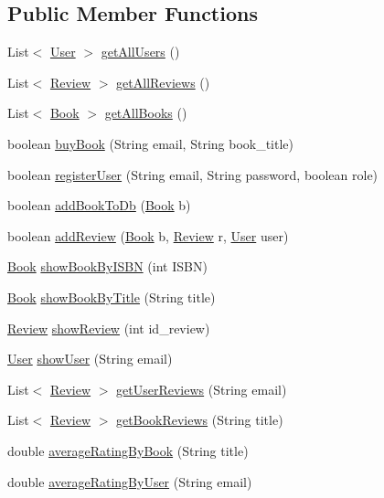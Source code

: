 \subsection*{Public Member Functions}
\begin{DoxyCompactItemize}
\item 
List$<$ \hyperlink{classserver_1_1data_1_1_user}{User} $>$ \hyperlink{interfacedb_1_1_i_d_b_a39ad15619eae3d0ec652e1849e3ebd50}{get\+All\+Users} ()
\item 
List$<$ \hyperlink{classserver_1_1data_1_1_review}{Review} $>$ \hyperlink{interfacedb_1_1_i_d_b_a08f60c8b923599c650f04b4192d00d55}{get\+All\+Reviews} ()
\item 
List$<$ \hyperlink{classserver_1_1data_1_1_book}{Book} $>$ \hyperlink{interfacedb_1_1_i_d_b_abd0d41674bbcdd524a3ca2403504bf25}{get\+All\+Books} ()
\item 
boolean \hyperlink{interfacedb_1_1_i_d_b_a2ac985a90e8369fab676950b3fb4c2bc}{buy\+Book} (String email, String book\+\_\+title)
\item 
boolean \hyperlink{interfacedb_1_1_i_d_b_a92913d9357ef22978adc35d3fb9d3590}{register\+User} (String email, String password, boolean role)
\item 
boolean \hyperlink{interfacedb_1_1_i_d_b_a63904b26597f651ea6acbd03384e0afb}{add\+Book\+To\+Db} (\hyperlink{classserver_1_1data_1_1_book}{Book} b)
\item 
boolean \hyperlink{interfacedb_1_1_i_d_b_a00a453c6d4fc604615f5a173d86600fc}{add\+Review} (\hyperlink{classserver_1_1data_1_1_book}{Book} b, \hyperlink{classserver_1_1data_1_1_review}{Review} r, \hyperlink{classserver_1_1data_1_1_user}{User} user)
\item 
\hyperlink{classserver_1_1data_1_1_book}{Book} \hyperlink{interfacedb_1_1_i_d_b_aed305f6c36ff140084636a8eded479db}{show\+Book\+By\+I\+S\+BN} (int I\+S\+BN)
\item 
\hyperlink{classserver_1_1data_1_1_book}{Book} \hyperlink{interfacedb_1_1_i_d_b_a6418edaf7c25f99f0422c0000db521fa}{show\+Book\+By\+Title} (String title)
\item 
\hyperlink{classserver_1_1data_1_1_review}{Review} \hyperlink{interfacedb_1_1_i_d_b_a6c44c3135f07ec6dbef84ecc6fe4f90f}{show\+Review} (int id\+\_\+review)
\item 
\hyperlink{classserver_1_1data_1_1_user}{User} \hyperlink{interfacedb_1_1_i_d_b_a8dca82226b1c27ceb4b765259546513d}{show\+User} (String email)
\item 
List$<$ \hyperlink{classserver_1_1data_1_1_review}{Review} $>$ \hyperlink{interfacedb_1_1_i_d_b_afd7ee8924344c13a64a1363d1a295771}{get\+User\+Reviews} (String email)
\item 
List$<$ \hyperlink{classserver_1_1data_1_1_review}{Review} $>$ \hyperlink{interfacedb_1_1_i_d_b_a6b8fda48df77b542b8713bc4f035bccf}{get\+Book\+Reviews} (String title)
\item 
double \hyperlink{interfacedb_1_1_i_d_b_a4d23da2e383e7fe0638089fb2686b6c3}{average\+Rating\+By\+Book} (String title)
\item 
double \hyperlink{interfacedb_1_1_i_d_b_a5bb2209c976ab0a7f20606ed5df0e0cf}{average\+Rating\+By\+User} (String email)
\end{DoxyCompactItemize}


